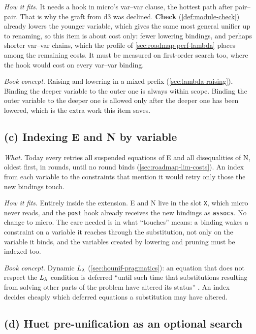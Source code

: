 \emph{How it fits.} It needs a hook in micro's var--var clause, the hottest path after pair--pair. That
is why the graft from d3 was declined. \textbf{Check} (\cref{def:module-check}) already lowers the
younger variable, which gives the same most general unifier up to renaming, so this item is about cost only: fewer lowering bindings, and
perhaps shorter var--var chains, which the profile of \cref{sec:roadmap-perf-lambda} places among the
remaining costs. It must be measured on first-order search too, where the hook would cost on every
var--var binding.

\emph{Book concept.} Raising and lowering in a mixed prefix (\cref{sec:lambda-raising}). Binding the
deeper variable to the outer one is always within scope. Binding the outer variable to the deeper one is
allowed only after the deeper one has been lowered, which is the extra work this item saves.

\subsection{(c) Indexing E and N by variable}\label{sec:roadmap-later-index}

\emph{What.} Today every  retries all suspended equations of E and all disequalities of N, oldest
first, in rounds, until no round binds (\cref{sec:roadmap-lim-costs}). An index from each variable to the
constraints that mention it would retry only those the new bindings touch.

\emph{How it fits.} Entirely inside the extension. E and N live in the slot \texttt{X}, which micro never
reads, and the \texttt{post} hook already receives the new bindings as \texttt{assocs}. No change to micro.
The care needed is in what \enquote{touches} means: a binding wakes a constraint on a variable it reaches
through the substitution, not only on the variable it binds, and the variables created by lowering and
pruning must be indexed too.

\emph{Book concept.} Dynamic $L_\lambda$ (\cref{sec:hounif-pragmatics}): an equation that does not respect the
$L_\lambda$ condition is deferred \enquote{until such time that substitutions resulting from solving other parts of
the problem have altered its status} . An index decides cheaply which deferred equations a
substitution may have altered.

\subsection{(d) Huet pre-unification as an optional search}\label{sec:roadmap-later-huet}

